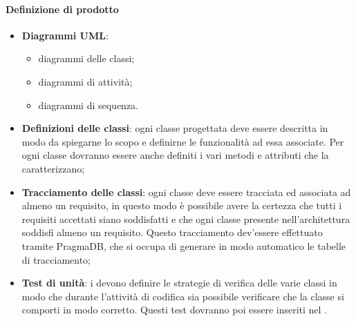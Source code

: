  \paragraph{Definizione di prodotto}
 \begin{itemize}
 	\item \textbf{Diagrammi UML}:
 	\begin{itemize}
 		\item diagrammi delle classi;
 		\item diagrammi di attività;
 		\item diagrammi di sequenza.
 	\end{itemize}
 	\item \textbf{Definizioni delle classi}: ogni classe progettata deve essere descritta in modo da spiegarne lo scopo e definirne le
 	funzionalità ad essa associate. Per ogni classe dovranno essere anche definiti i vari metodi e attributi che la caratterizzano;
 	\item \textbf{Tracciamento delle classi}: ogni classe deve essere tracciata ed associata ad almeno un requisito, in questo modo è possibile avere la certezza che tutti i requisiti accettati siano	soddisfatti e che ogni classe presente nell’architettura soddisfi almeno un requisito. Questo 	tracciamento dev’essere effettuato tramite PragmaDB, che si occupa di generare in modo automatico le tabelle di tracciamento;
 	\item \textbf{Test di unità}: i \PJP{} devono definire le strategie di verifica delle varie classi in modo che durante l’attività di codifica sia possibile verificare che la classe si comporti in modo corretto. Questi test dovranno poi essere inseriti nel .
 \end{itemize}
